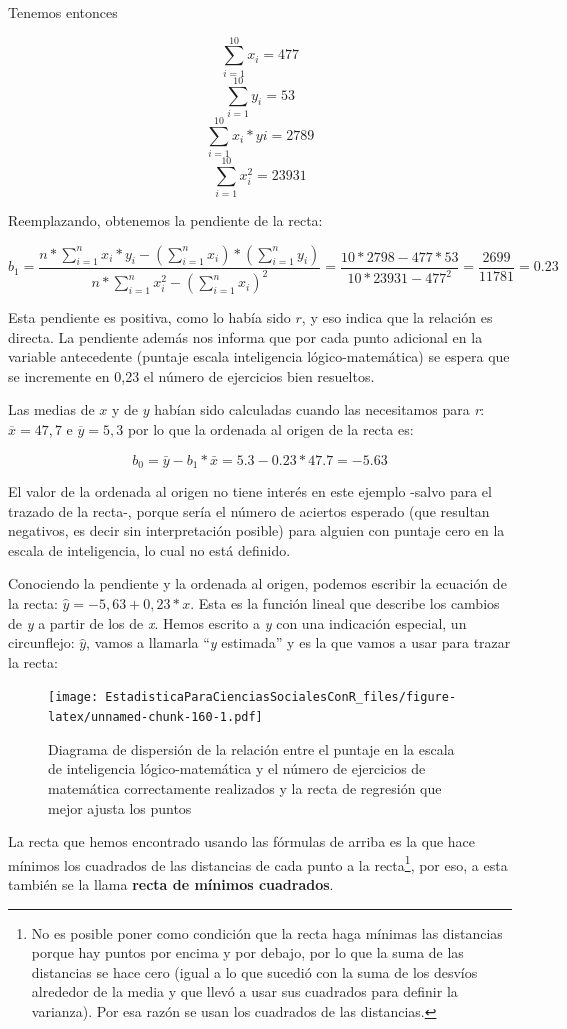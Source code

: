 \documentclass[]{book}
\let\rmarkdownfootnote\footnote%
\def\footnote{\protect\rmarkdownfootnote}
\begin{document}
Tenemos entonces

\[\sum_{i=1}^{10}x_i=477\]
\[\sum_{i=1}^{10}y_i=53\]
\[\sum_{i=1}^{10}x_i*yi=2789\]
\[\sum_{i=1}^{10}x_i^{2}=23931\]

Reemplazando, obtenemos la pendiente de la recta:

\[b_1=\frac{n*\sum_{i=1}^{n}{x_i*y_i}-(\sum_{i=1}^{n}x_i)*(\sum_{i=1}^{n}y_i)}{n*\sum_{i=1}^{n}x_i^{2}-(\sum_{i=1}^{n}x_i )^{2}}= \frac{10*2798-477*53}{10*23931-477^{2}}=\frac{2699}{11781}=0.23\]

Esta pendiente es positiva, como lo había sido \(r\), y eso indica que la relación es directa. La pendiente además nos informa que por cada punto adicional en la variable antecedente (puntaje escala inteligencia lógico-matemática) se espera que se incremente en 0,23 el número de ejercicios bien resueltos.

Las medias de \(x\) y de \(y\) habían sido calculadas cuando las necesitamos
para \emph{r}: \(\overline{x} = 47,7\) e \(\overline{y} = 5,3\) por lo que la
ordenada al origen de la recta es:

\[b_0=\bar{y}-b_1*\bar{x}=5.3-0.23*47.7=-5.63\]

El valor de la ordenada al origen no tiene interés en este ejemplo
-salvo para el trazado de la recta-, porque sería el número de aciertos esperado (que resultan negativos, es decir sin interpretación posible) para alguien con puntaje cero en la escala de inteligencia, lo cual no está definido.

Conociendo la pendiente y la ordenada al origen, podemos escribir la
ecuación de la recta: \(\widehat{y} = - 5,63 + 0,23*x\). Esta es la
función lineal que describe los cambios de \emph{y} a partir de los de \emph{x}.
Hemos escrito a \emph{y} con una indicación especial, un
circunflejo: \(\widehat{y}\), vamos a llamarla ``\emph{y} estimada'' y es la que
vamos a usar para trazar la recta:

\begin{figure}
\centering
\texttt{[image: EstadisticaParaCienciasSocialesConR\_files/figure-latex/unnamed-chunk-160-1.pdf]}
\caption{\label{fig:unnamed-chunk-160}Diagrama de dispersión de la relación entre el puntaje en la escala de inteligencia lógico-matemática y el número de ejercicios de matemática correctamente realizados y la recta de regresión que mejor ajusta los puntos}
\end{figure}

La recta que hemos encontrado usando las fórmulas de arriba es la que
hace mínimos los cuadrados de las distancias de cada punto a la
recta\footnote{No es posible poner como condición que la recta haga mínimas las distancias porque hay puntos por encima y por debajo, por lo que la suma de las distancias se hace cero (igual a lo que sucedió con la suma de los desvíos alrededor de la media y que llevó a usar sus cuadrados para definir la varianza). Por esa razón se usan los cuadrados de las distancias.}, por eso, a esta también se la llama \textbf{recta de mínimos cuadrados}.
\end{document}
